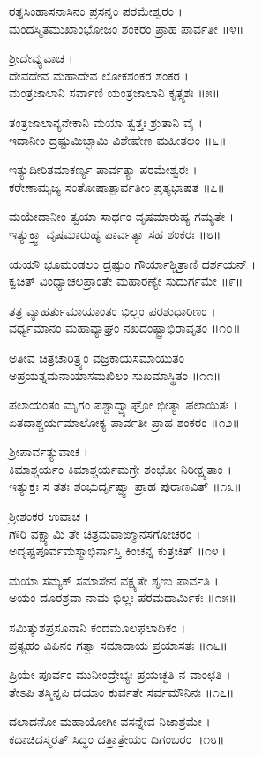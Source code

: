 ರತ್ನಸಿಂಹಾಸನಾಸಿನಂ ಪ್ರಸನ್ನಂ ಪರಮೇಶ್ವರಂ ।\\
ಮಂದಸ್ಮಿತಮುಖಾಂಭೋಜಂ ಶಂಕರಂ ಪ್ರಾಹ ಪಾರ್ವತೀ ॥೪॥

ಶ್ರೀದೇವ್ಯುವಾಚ ।\\
ದೇವದೇವ ಮಹಾದೇವ ಲೋಕಶಂಕರ ಶಂಕರ ।\\
ಮಂತ್ರಜಾಲಾನಿ ಸರ್ವಾಣಿ ಯಂತ್ರಜಾಲಾನಿ ಕೃತ್ಸ್ನಶಃ ॥೫॥

ತಂತ್ರಜಾಲಾನ್ಯನೇಕಾನಿ ಮಯಾ ತ್ವತ್ತಃ ಶ್ರುತಾನಿ ವೈ ।\\
ಇದಾನೀಂ ದ್ರಷ್ಟುಮಿಚ್ಛಾಮಿ ವಿಶೇಷೇಣ ಮಹೀತಲಂ ॥೬॥

ಇತ್ಯುದೀರಿತಮಾಕರ್ಣ್ಯ ಪಾರ್ವತ್ಯಾ ಪರಮೇಶ್ವರಃ ।\\
ಕರೇಣಾಮೃಜ್ಯ ಸಂತೋಷಾತ್ಪಾರ್ವತೀಂ ಪ್ರತ್ಯಭಾಷತ ॥೭॥

ಮಯೇದಾನೀಂ ತ್ವಯಾ ಸಾರ್ಧಂ ವೃಷಮಾರುಹ್ಯ ಗಮ್ಯತೇ ।\\
ಇತ್ಯುಕ್ತ್ವಾ ವೃಷಮಾರುಹ್ಯ ಪಾರ್ವತ್ಯಾ ಸಹ ಶಂಕರಃ ॥೮॥

ಯಯೌ ಭೂಮಂಡಲಂ ದ್ರಷ್ಟುಂ ಗೌರ್ಯಾಶ್ಚಿತ್ರಾಣಿ ದರ್ಶಯನ್ ।\\
ಕ್ವಚಿತ್ ವಿಂಧ್ಯಾಚಲಪ್ರಾಂತೇ ಮಹಾರಣ್ಯೇ ಸುದುರ್ಗಮೇ ॥೯॥

ತತ್ರ ವ್ಯಾಹರ್ತುಮಾಯಾಂತಂ ಭಿಲ್ಲಂ ಪರಶುಧಾರಿಣಂ ।\\
ವರ್ಧ್ಯಮಾನಂ ಮಹಾವ್ಯಾಘ್ರಂ ನಖದಂಷ್ಟ್ರಾಭಿರಾವೃತಂ ॥೧೦॥

ಅತೀವ ಚಿತ್ರಚಾರಿತ್ರ್ಯಂ ವಜ್ರಕಾಯಸಮಾಯುತಂ ।\\
ಅಪ್ರಯತ್ನಮನಾಯಾಸಮಖಿಲಂ ಸುಖಮಾಸ್ಥಿತಂ ॥೧೧॥

ಪಲಾಯಂತಂ ಮೃಗಂ ಪಶ್ಚಾದ್ವ್ಯಾಘ್ರೋ ಭೀತ್ಯಾ ಪಲಾಯಿತಃ ।\\
ಏತದಾಶ್ಚರ್ಯಮಾಲೋಕ್ಯ ಪಾರ್ವತೀ ಪ್ರಾಹ ಶಂಕರಂ ॥೧೨॥

ಶ್ರೀಪಾರ್ವತ್ಯುವಾಚ ।\\
ಕಿಮಾಶ್ಚರ್ಯಂ ಕಿಮಾಶ್ಚರ್ಯಮಗ್ರೇ ಶಂಭೋ ನಿರೀಕ್ಷ್ಯತಾಂ ।\\
ಇತ್ಯುಕ್ತಃ ಸ ತತಃ ಶಂಭುರ್ದೃಷ್ಟ್ವಾ ಪ್ರಾಹ ಪುರಾಣವಿತ್ ॥೧೩॥

ಶ್ರೀಶಂಕರ ಉವಾಚ ।\\
ಗೌರಿ ವಕ್ಷ್ಯಾಮಿ ತೇ ಚಿತ್ರಮವಾಙ್ಮಾನಸಗೋಚರಂ ।\\
ಅದೃಷ್ಟಪೂರ್ವಮಸ್ಮಾಭಿರ್ನಾಸ್ತಿ ಕಿಂಚನ್ನ ಕುತ್ರಚಿತ್ ॥೧೪॥

ಮಯಾ ಸಮ್ಯಕ್ ಸಮಾಸೇನ ವಕ್ಷ್ಯತೇ ಶೃಣು ಪಾರ್ವತಿ ।\\
ಅಯಂ ದೂರಶ್ರವಾ ನಾಮ ಭಿಲ್ಲಃ ಪರಮಧಾರ್ಮಿಕಃ ॥೧೫॥

ಸಮಿತ್ಕುಶಪ್ರಸೂನಾನಿ ಕಂದಮೂಲಫಲಾದಿಕಂ ।\\
ಪ್ರತ್ಯಹಂ ವಿಪಿನಂ ಗತ್ವಾ ಸಮಾದಾಯ ಪ್ರಯಾಸತಃ ॥೧೬॥

ಪ್ರಿಯೇ ಪೂರ್ವಂ ಮುನೀಂದ್ರೇಭ್ಯಃ ಪ್ರಯಚ್ಛತಿ ನ ವಾಂಛತಿ ।\\
ತೇಽಪಿ ತಸ್ಮಿನ್ನಪಿ ದಯಾಂ ಕುರ್ವತೇ ಸರ್ವಮೌನಿನಃ ॥೧೭॥

ದಲಾದನೋ ಮಹಾಯೋಗೀ ವಸನ್ನೇವ ನಿಜಾಶ್ರಮೇ ।\\
ಕದಾಚಿದಸ್ಮರತ್ ಸಿದ್ಧಂ ದತ್ತಾತ್ರೇಯಂ ದಿಗಂಬರಂ ॥೧೮॥

